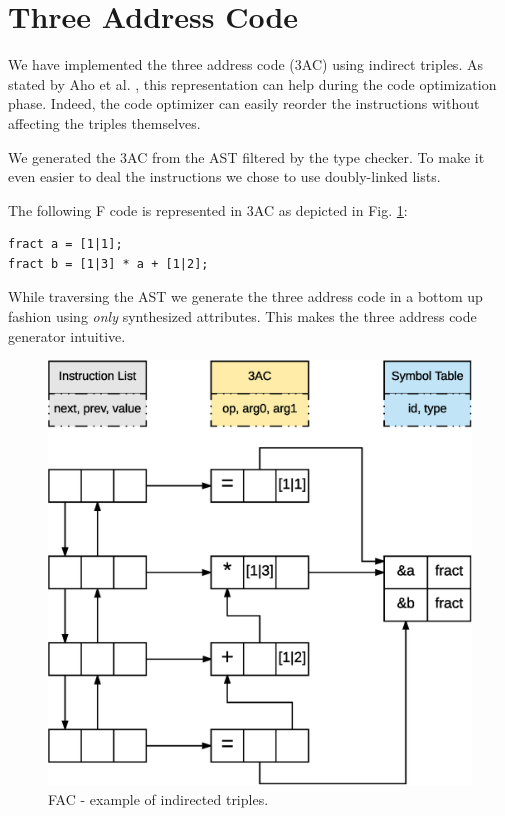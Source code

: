 \section{Three Address Code}
We have implemented the three address code (3AC) using indirect triples. 
As stated by Aho et al. \cite{dragonbook}, this 
representation can help during the code optimization phase.
Indeed, the code optimizer can easily reorder the instructions without affecting
the triples themselves.

We generated the 3AC from the AST filtered by the type checker. 
To make it even easier to deal the instructions we chose to use
doubly-linked lists.

The following F code is represented in 3AC as depicted in Fig. 
\ref{fig:ind-trpl}:
\begin{verbatim}
fract a = [1|1];
fract b = [1|3] * a + [1|2];
\end{verbatim}

While traversing the AST we generate the three address code in a bottom up
fashion using \emph{only} synthesized attributes. This makes the three address
code generator intuitive.

\begin{figure}[H]
  \centering
  \includegraphics[width=.9\columnwidth]{img/eps/indirect_triples.eps}
  \caption{FAC - example of indirected triples.}
  \label{fig:ind-trpl}
\end{figure}
